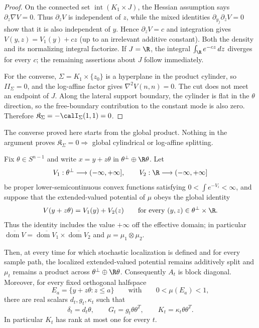 \documentclass[../main.tex]{subfiles}
\begin{document}
\begin{proof}
On the connected set $\operatorname{int}(K_1\times J)$, the Hessian assumption says
$\partial_z\nabla V=0$.  Thus $\partial_zV$ is independent of $z$, while the mixed identities
$\partial_{y_j}\partial_zV=0$ show that it is also independent of $y$.  Hence
$\partial_zV=c$ and integration gives $V(y,z)=V_1(y)+cz$ (up to an irrelevant additive
constant).  Both the density and its normalizing integral factorize.  If $J=\R$, the integral
$\int_\R e^{-cz}\,dz$ diverges for every $c$; the remaining assertions about $J$ follow
immediately.

For the converse, $\Sigma=K_1\times\{z_0\}$ is a hyperplane in the product cylinder, so
$II_\Sigma=0$, and the log-affine factor gives $\nabla^2V(n,n)=0$.  The cut does not meet an
endpoint of $J$.  Along the lateral support boundary, the cylinder is flat in the $\theta$
direction, so the free-boundary contribution to the constant mode is also zero.  Therefore
$\mathfrak K_\Sigma=-\calI_\Sigma(1,1)=0$.
\end{proof}

The converse proved here starts from the global product.  Nothing in the argument proves
$\mathfrak K_\Sigma=0\Rightarrow$ global cylindrical or log-affine splitting.

\begin{proposition}[= Proposition~\ref{prop:persistent-splitting}]
\label{prop:sol-persistent-splitting}
Fix $\theta\in S^{n-1}$ and write $x=y+z\theta$ in
$\theta^\perp\oplus\R\theta$.  Let
\[
  V_1:\theta^\perp\longrightarrow(-\infty,+\infty],
  \qquad
  V_2:\R\longrightarrow(-\infty,+\infty]
\]
be proper lower-semicontinuous convex functions satisfying
$0<\int e^{-V_i}<\infty$, and suppose that the extended-valued potential of $\mu$ obeys the
global identity
\begin{equation}\label{eq:sol-global-additive-potential}
  V(y+z\theta)=V_1(y)+V_2(z)
  \qquad\text{for every }(y,z)\in\theta^\perp\times\R.
\end{equation}
Thus the identity includes the value $+\infty$ off the effective domain; in particular
$\overline{\operatorname{dom}V}=\overline{\operatorname{dom}V_1}
\times\overline{\operatorname{dom}V_2}$ and
$\mu=\mu_1\otimes\mu_2$.

Then, at every time for which stochastic localization is defined and for every sample path, the
localized extended-valued potential remains additively split and $\mu_t$ remains a product
across $\theta^\perp\oplus\R\theta$.  Consequently $A_t$ is block diagonal.  Moreover, for
every fixed orthogonal halfspace
\[
  E_a=\{y+z\theta:z\le a\}
  \qquad\text{with}\qquad 0<\mu(E_a)<1,
\]
there are real scalars $d_t,g_t,\kappa_t$ such that
\[
  \delta_t=d_t\theta,
  \qquad G_t=g_t\theta\theta^T,
  \qquad K_t=\kappa_t\theta\theta^T.
\]
In particular $K_t$ has rank at most one for every $t$.
\end{proposition}
\end{document}
